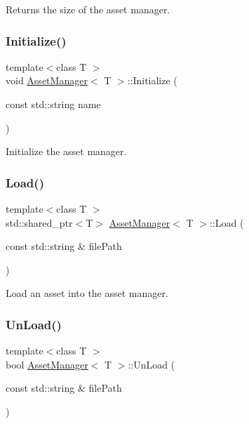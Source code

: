 Returns the size of the asset manager. \mbox{\label{class_asset_manager_ace92285c403c555e8e6fdb258e9e57d0}} 
\subsubsection{\texorpdfstring{Initialize()}{Initialize()}}
{\footnotesize\ttfamily template$<$class T $>$ \\
void \mbox{\hyperlink{class_asset_manager}{Asset\+Manager}}$<$ T $>$\+::Initialize (\begin{DoxyParamCaption}\item[{const std\+::string}]{name }\end{DoxyParamCaption})\hspace{0.3cm}{\ttfamily [inline]}}

Initialize the asset manager. \mbox{\label{class_asset_manager_ad685ea526834b044a13fe07e630bfe0a}} 
\subsubsection{\texorpdfstring{Load()}{Load()}}
{\footnotesize\ttfamily template$<$class T $>$ \\
std\+::shared\+\_\+ptr$<$T$>$ \mbox{\hyperlink{class_asset_manager}{Asset\+Manager}}$<$ T $>$\+::Load (\begin{DoxyParamCaption}\item[{const std\+::string \&}]{file\+Path }\end{DoxyParamCaption})\hspace{0.3cm}{\ttfamily [inline]}}

Load an asset into the asset manager. \mbox{\label{class_asset_manager_a5b015e693d11b39ee98a094ef9d74966}} 
\subsubsection{\texorpdfstring{Un\+Load()}{UnLoad()}}
{\footnotesize\ttfamily template$<$class T $>$ \\
bool \mbox{\hyperlink{class_asset_manager}{Asset\+Manager}}$<$ T $>$\+::Un\+Load (\begin{DoxyParamCaption}\item[{const std\+::string \&}]{file\+Path }\end{DoxyParamCaption})\hspace{0.3cm}{\ttfamily [inline]}}

